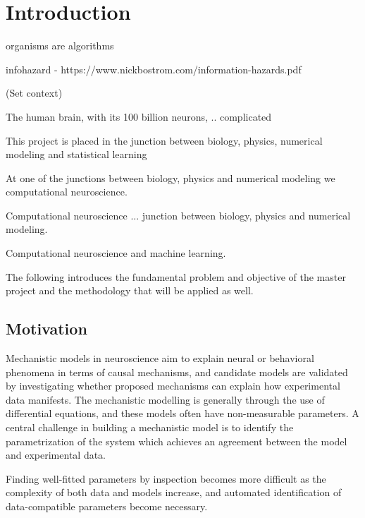 \chapter{Introduction}


organisms are algorithms

infohazard - https://www.nickbostrom.com/information-hazards.pdf

(Set context)

The human brain, with its 100 billion neurons, .. complicated 

This project is placed in the junction between biology, physics, numerical modeling and statistical learning 


At one of the junctions between biology, physics and numerical modeling we computational neuroscience. 

Computational neuroscience ... junction between biology, physics and numerical modeling. 

Computational neuroscience and machine learning. 

The following introduces the fundamental problem and objective of the master project and the methodology that will be applied as well.

\section{Motivation}\label{sec:Motivation}

Mechanistic models in neuroscience aim to explain neural or behavioral phenomena in terms of causal mechanisms, and candidate models are validated by investigating whether proposed mechanisms can explain how experimental data manifests. The mechanistic modelling is generally through the use of differential equations, and these models often have non-measurable parameters. A central challenge in building a mechanistic model is to identify the parametrization of the system which achieves an agreement between the model and experimental data. 

Finding well-fitted parameters by inspection becomes more difficult as the complexity of both data and models increase, and automated identification of data-compatible parameters become necessary. 

